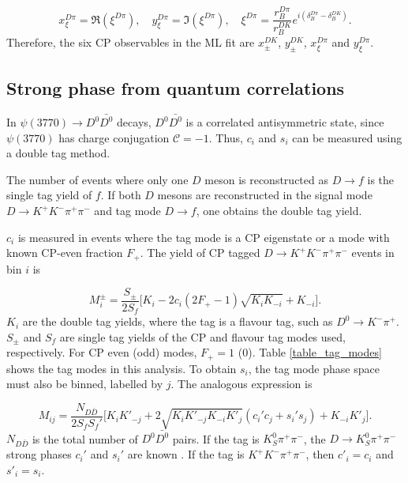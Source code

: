 \documentclass[12pt, a4paper, notitlepage, onecolumn]{article}
\begin{document}
\begin{equation*}
  x_\xi^{D\pi} = \Re(\xi^{D\pi}), \quad y_\xi^{D\pi} = \Im(\xi^{D\pi}), \quad \xi^{D\pi} = \frac{r_B^{D\pi}}{r_B^{DK}}e^{i(\delta_B^{D\pi} - \delta_B^{DK})}.
\end{equation*}
Therefore, the six CP observables in the ML fit are $x_\pm^{DK}$, $y_\pm^{DK}$, $x_\xi^{D\pi}$ and $y_\xi^{D\pi}$.

\subsection{Strong phase from quantum correlations}
In $\psi(3770)\to D^0\bar{D^0}$ decays, $D^0\bar{D^0}$ is a correlated antisymmetric state, since $\psi(3770)$ has charge conjugation $\mathcal{C} = -1$. Thus, $c_i$ and $s_i$ can be measured using a double tag method.

The number of events where only one $D$ meson is reconstructed as $D\to f$ is the single tag yield of $f$. If both $D$ mesons are reconstructed in the signal mode $D\to K^+K^-\pi^+\pi^-$ and tag mode $D\to f$, one obtains the double tag yield.

$c_i$ is measured in events where the tag mode is a CP eigenstate or a mode with known CP-even fraction $F_+$. The yield of CP tagged $D\to K^+K^-\pi^+\pi^-$ events in bin $i$ is

\begin{equation}
  M_i^\pm = \frac{S_\pm}{2S_f}\Big[K_i - 2c_i(2F_+ - 1)\sqrt{K_iK_{-i}} + K_{-i}\Big].
  \label{eq_Mi}
\end{equation}
$K_i$ are the double tag yields, where the tag is a flavour tag, such as $D^0\to K^-\pi^+$. $S_\pm$ and $S_f$ are single tag yields of the CP and flavour tag modes used, respectively. For CP even (odd) modes, $F_+ = 1$ ($0$). Table \ref{table_tag_modes} shows the tag modes in this analysis. To obtain $s_i$, the tag mode phase space must also be binned, labelled by $j$. The analogous expression is

\begin{equation}
  M_{ij} = \frac{N_{D\bar{D}}}{2S_fS_f'}\Big[K_iK'_{-j} + 2\sqrt{K_iK'_{-j}K_{-i}K'_j}(c_i'c_j + s_i's_j) + K_{-i}K'_j\Big].
  \label{eq_Mij}
\end{equation}
$N_{D\bar{D}}$ is the total number of $D^0\bar{D^0}$ pairs. If the tag is $K_S^0\pi^+\pi^-$, the $D\to K_S^0\pi^+\pi^-$ strong phases $c_i'$ and $s_i'$ are known \cite{cite_KSKKAnalysis}. If the tag is $K^+K^-\pi^+\pi^-$, then $c'_i = c_i$ and $s'_i = s_i$.
\end{document}
